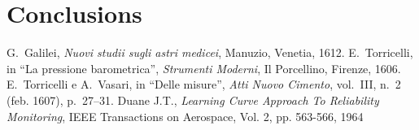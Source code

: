 \documentclass[%
    corpo=13.5pt,
    twoside,
    oldstyle,
    tipotesi=magistrale,
    greek,
    evenboxes
]{toptesi}
\begin{document}
\chapter{Conclusions}


\begin{thebibliography}{9}
 G.~Galilei, {\em Nuovi studii sugli astri medicei}, Manuzio,
        Venetia, 1612.
 E.~Torricelli, in ``La pressione barometrica'', {\em Strumenti
        Moderni}, Il Porcellino, Firenze, 1606.
 E.~Torricelli e A.~Vasari, in ``Delle misure'', {\em Atti Nuovo
        Cimento}, vol.~III, n.~2 (feb. 1607), p.~27--31.
 Duane J.T., \emph{Learning Curve Approach To Reliability
		Monitoring}, IEEE Transactions on Aerospace, Vol. 2, pp. 563-566, 1964
\end{thebibliography}
\end{document}
